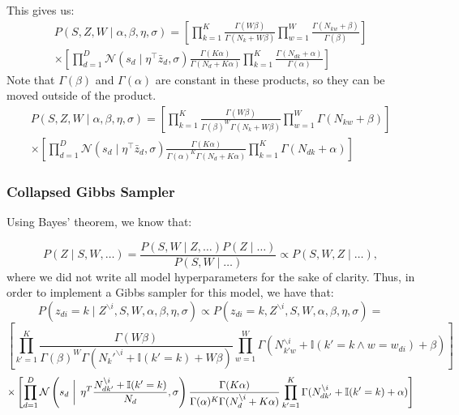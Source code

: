 \documentclass{article} %
\begin{document}
This gives us:
\begin{equation}
\begin{gathered}
P(S, Z, W \mid \alpha, \beta, \eta, \sigma) =  \left[ \prod_{k = 1}^K \frac{ \Gamma(W\beta)}{\Gamma(N_k + W\beta)} \prod_{w = 1}^W \frac{\Gamma(N_{kw}+\beta)}{\Gamma(\beta)}\right]  \\
\times\left[ \prod_{d = 1}^D \mathcal{N}(s_d \mid \eta^\top \bar{z}_d, \sigma) \frac{\Gamma(K\alpha)}{\Gamma(N_d + K \alpha)} \prod_{k = 1}^K \frac{\Gamma(N_{dk} + \alpha)}{\Gamma(\alpha)} \right]
\end{gathered}
\end{equation}
Note that $\Gamma(\beta)$ and $\Gamma(\alpha)$ are constant in these products, so they can be moved outside of the product.
\begin{equation}
\begin{gathered}
P(S, Z, W \mid \alpha, \beta, \eta, \sigma) = \left[ \prod_{k = 1}^K \frac{ \Gamma(W\beta)}{\Gamma(\beta)^W \Gamma(N_k + W\beta)} \prod_{w = 1}^W \Gamma(N_{kw}+\beta)\right]\\
\times\left[ \prod_{d = 1}^D \mathcal{N}(s_d \mid \eta^\top \bar{z}_d, \sigma) \frac{\Gamma(K\alpha)}{\Gamma(\alpha)^K \Gamma(N_d + K \alpha)} \prod_{k = 1}^K \Gamma(N_{dk} + \alpha) \right]
\end{gathered}
\end{equation}

\subsubsection{Collapsed Gibbs Sampler}

Using Bayes' theorem, we know that:

\begin{equation}
P(Z \mid S, W, \dots) = \frac{P(S, W \mid Z, \dots) P(Z \mid \dots)}{P(S, W \mid \dots)} \propto P(S, W, Z \mid \dots),
\end{equation}
where we did not write all model hyperparameters for the sake of clarity.
Thus, in order to implement a Gibbs sampler for this model, we have that:
\[P(z_{di} = k \mid Z^{\backslash{i}}, S, W, \alpha, \beta, \eta, \sigma) \propto P(z_{di} = k, Z^{\backslash{i}}, S, W, \alpha, \beta, \eta, \sigma) = \]
\[  \left[ \prod_{k' = 1}^K \frac{ \Gamma(W\beta)}{\Gamma(\beta)^W \Gamma(N_k'^{\backslash i} + \mathbb{I}(k' = k) + W\beta)} \prod_{w = 1}^W \Gamma(N_{k'w}^{\backslash i} + \mathbb{I}(k' = k \wedge w = w_{di}) + \beta)\right] \]
\[ \times\left[ \prod_{d = 1}^D \mathcal{N}\left(s_d\, \left| \vphantom{\frac{1}{1}} \right. \, \eta^T \frac{N_{d{k'}}^{\backslash i} + \mathbb{I}(k' = k)}{N_d}, \sigma \right) \frac{\Gamma(K\alpha)}{\Gamma(\alpha)^K \Gamma(N_d^{\backslash i} + K \alpha)} \prod_{k' = 1}^K \Gamma(N_{dk'}^{\backslash i} + \mathbb{I}(k' = k) + \alpha) \right] \]
\end{document}
